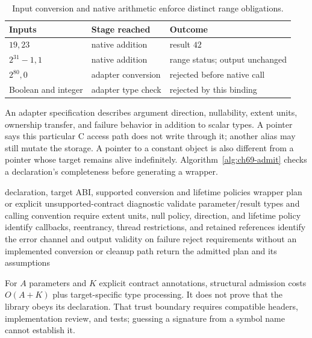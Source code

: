\begin{table}[htbp]
\caption{Input conversion and native arithmetic enforce distinct range obligations.}
\label{tab:ch69-add}
\centering
\begin{tabular}{lll}
\toprule
Inputs & Stage reached & Outcome \\
\midrule
$19,23$ & native addition & result $42$ \\
$2^{31}-1,1$ & native addition & range status; output unchanged \\
$2^{80},0$ & adapter conversion & rejected before native call \\
Boolean and integer & adapter type check & rejected by this binding \\
\bottomrule
\end{tabular}
\end{table}

An adapter specification describes argument direction, nullability, extent units, ownership transfer, and failure behavior in addition to scalar types.
A  pointer says this particular C access path does not write through it; another alias may still mutate the storage.
A pointer to a constant object is also different from a pointer whose target remains alive indefinitely.
Algorithm~\ref{alg:ch69-admit} checks a declaration's completeness before generating a wrapper.

\begin{algorithm}[htbp]
\caption{Admit a foreign declaration with a complete supported boundary contract.}
\label{alg:ch69-admit}
\begin{pseudocode}
\Require declaration, target ABI, supported conversion and lifetime policies
\Ensure wrapper plan or explicit unsupported-contract diagnostic
\State validate parameter/result types and calling convention
  \State require extent units, null policy, direction, and lifetime policy
\EndFor
\State identify callbacks, reentrancy, thread restrictions, and retained references
\State identify the error channel and output validity on failure
\State reject requirements without an implemented conversion or cleanup path
\State return the admitted plan and its assumptions
\end{pseudocode}
\end{algorithm}

For $A$ parameters and $K$ explicit contract annotations, structural admission costs $O(A+K)$ plus target-specific type processing.
It does not prove that the library obeys its declaration.
That trust boundary requires compatible headers, implementation review, and tests; guessing a signature from a symbol name cannot establish it.


